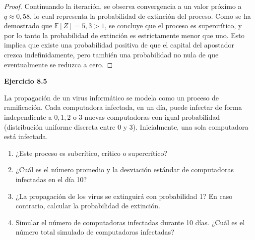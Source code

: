 \documentclass{article}
\begin{document}
\begin{proof}
Continuando la iteración, se observa convergencia a un valor próximo a \( q \approx 0{,}58 \), lo cual representa la probabilidad de extinción del proceso.
Como se ha demostrado que \( \mathbb{E}[Z] = 5{,}3 > 1 \), se concluye que el proceso es supercrítico, y por lo tanto la probabilidad de extinción es estrictamente menor que uno. Esto implica que existe una probabilidad positiva de que el capital del apostador crezca indefinidamente, pero también una probabilidad no nula de que eventualmente se reduzca a cero.
   
\end{proof}

\textbf{Ejercicio 8.5}

La propagación de un virus informático se modela como un proceso de ramificación. Cada computadora infectada, en un día, puede infectar de forma independiente a \( 0, 1, 2 \) o \( 3 \) nuevas computadoras con igual probabilidad (distribución uniforme discreta entre 0 y 3). Inicialmente, una sola computadora está infectada.

\begin{enumerate}[label=(\alph*)]
    \item ¿Este proceso es subcrítico, crítico o supercrítico?
    \item ¿Cuál es el número promedio y la desviación estándar de computadoras infectadas en el día 10?
    \item ¿La propagación de los virus se extinguirá con probabilidad 1? En caso contrario, calcular la probabilidad de extinción.
    \item Simular el número de computadoras infectadas durante 10 días. ¿Cuál es el número total simulado de computadoras infectadas?
\end{enumerate}
\end{document}
